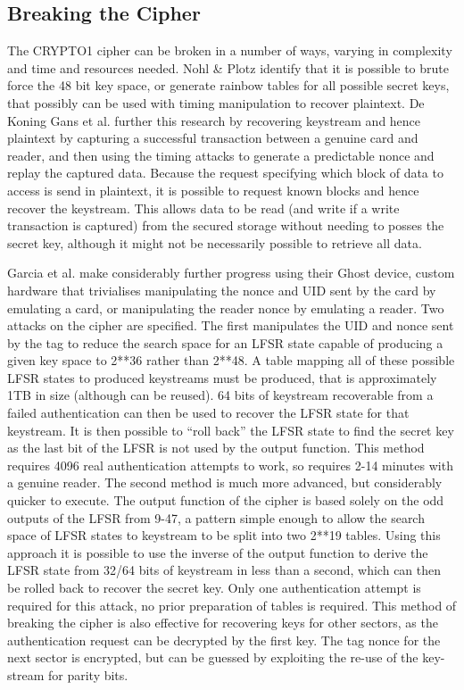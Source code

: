 \documentclass[pdflatex, a4paper,12pt]{article}
\begin{document}
\subsection{Breaking the Cipher}

The CRYPTO1 cipher can be broken in a number of ways, varying in complexity and
time and resources needed. Nohl \& Plotz identify that it is possible to brute
force the 48 bit key space, or generate rainbow tables for all possible secret
keys, that possibly can be used with timing manipulation to recover plaintext.
De Koning Gans et al. further this research by recovering keystream and hence
plaintext by capturing a successful transaction between a genuine card and
reader, and then using the timing attacks to generate a predictable nonce and
replay the captured data\cite{gans_practical_2008}. Because the request
specifying which block of data to
access is send in plaintext, it is possible to request known blocks and hence
recover the keystream. This allows data to be read (and write if a write
transaction is captured) from the secured storage without needing to posses the
secret key, although it might not be necessarily possible to retrieve all data.

Garcia et al. make considerably further progress using their Ghost device,
custom hardware that trivialises manipulating the nonce and UID sent by the card
by emulating a card, or manipulating the reader nonce by emulating a reader. Two
attacks on the cipher are specified. The first manipulates the UID and nonce
sent by the tag to reduce the search space for an LFSR state capable of
producing a given key space to 2**36 rather than 2**48. A table mapping all of
these possible LFSR states to produced keystreams must be produced, that is
approximately 1TB in size (although can be reused). 64 bits of keystream
recoverable from a failed authentication can then be used to recover the LFSR
state for that keystream. It is then possible to ``roll back'' the LFSR state to
find the secret key as the last bit of the LFSR is not used by the output
function. This method requires 4096 real authentication attempts to work, so
requires 2-14 minutes with a genuine reader. The second method is much more
advanced, but considerably quicker to execute. The output function of the cipher
is based solely on the odd outputs of the LFSR from 9-47, a pattern simple
enough to allow the search space of LFSR states to keystream to be split into
two 2**19 tables. Using this approach it is possible to use the inverse of the output
function to derive the LFSR state from 32/64 bits of keystream in less than a
second, which can then be rolled back to recover the secret key. Only one
authentication attempt is required for this attack, no prior preparation of
tables is required. This method of breaking the cipher is also effective for
recovering keys for other sectors, as the authentication request can be
decrypted by the first key. The tag nonce for the next sector is encrypted, but
can be guessed by exploiting the re-use of the key-stream for parity bits. 
\end{document}
